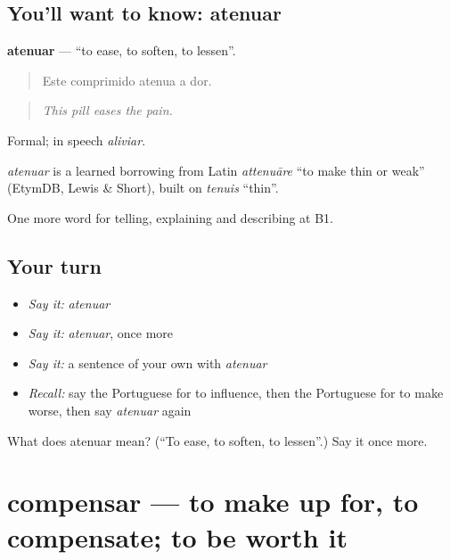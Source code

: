 \subsection*{You'll want to know: atenuar}
\textbf{atenuar} — \textquotedblleft{}to ease, to soften, to lessen\textquotedblright{}.

\begin{quote}
Este comprimido atenua a dor.
\end{quote}

\begin{quote}
\emph{This pill eases the pain.}
\end{quote}

Formal; in speech \emph{aliviar}.

\begin{cousinweb}
\emph{atenuar} is a learned borrowing from Latin \emph{attenuāre} \textquotedblleft{}to make thin or weak\textquotedblright{} (EtymDB, Lewis \& Short), built on \emph{tenuis} \textquotedblleft{}thin\textquotedblright{}.
\end{cousinweb}

\begin{grammarlens}[title={What you've built}]
One more word for telling, explaining and describing at B1.
\end{grammarlens}

\subsection*{Your turn}
\begin{itemize}
\raggedright
  \item \emph{Say it:} \emph{atenuar}
  \item \emph{Say it:} \emph{atenuar}, once more
  \item \emph{Say it:} a sentence of your own with \emph{atenuar}
  \item \emph{Recall:} say the Portuguese for to influence, then the Portuguese for to make worse, then say \emph{atenuar} again
\end{itemize}

\begin{tcolorbox}[breakable,colback=teal!4,colframe=teal!35!black,title={Before you move on}]
What does atenuar mean? (\textquotedblleft{}To ease, to soften, to lessen\textquotedblright{}.) Say it once more.
\end{tcolorbox}
\section[compensar]{compensar — to make up for, to compensate; to be worth it}

